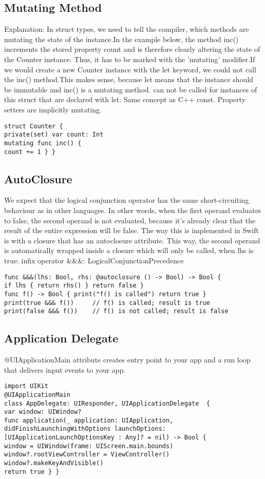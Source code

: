 \subsection{Mutating Method}
Explanation: In struct types, we need to tell the compiler, which methods are mutating the state of the instance.In the example below, the method inc() increments the stored property count and is therefore clearly altering the state of the Counter instance. Thus, it has to be marked with the 'mutating' modifier.If we would create a new Counter instance with the let keyword, we could not call the inc() method.This makes sense, because let means that the instance should be immutable and inc() is a mutating method.
can not be called for instances of this struct that are declared with let. Same concept as C++ const. Property setters are implicitly mutating.
\begin{lstlisting}
struct Counter {
private(set) var count: Int
mutating func inc() {
count += 1 } }
\end{lstlisting}

\subsection{AutoClosure}
We expect that the logical conjunction operator has the same short-circuiting behaviour as in other languages. In other words, when the first operand evaluates to false, the second operand is not evaluated, because it's already clear that the result of the entire expression will be false. The way this is implemented in Swift is with a closure that has an autoclosure attribute. This way, the second operand is automatically wrapped inside a closure which will only be called, when lhs is true:
infix operator \&\&\&: LogicalConjunctionPrecedence
\begin{lstlisting}
func &&&(lhs: Bool, rhs: @autoclosure () -> Bool) -> Bool {
if lhs { return rhs() } return false }
func f() -> Bool { print("f() is called") return true }
print(true &&& f())     // f() is called; result is true
print(false &&& f())	// f() is not called; result is false
\end{lstlisting}


\subsection{Application Delegate}
@UIApplicationMain attribute creates entry point to your app and a run loop that delivers input events to your app.
\begin{lstlisting}
import UIKit
@UIApplicationMain
class AppDelegate: UIResponder, UIApplicationDelegate  {
var window: UIWindow?
func application(_ application: UIApplication,
didFinishLaunchingWithOptions launchOptions: [UIApplicationLaunchOptionsKey : Any]? = nil) -> Bool {
window = UIWindow(frame: UIScreen.main.bounds)
window?.rootViewController = ViewController()
window?.makeKeyAndVisible()
return true } }
\end{lstlisting}

